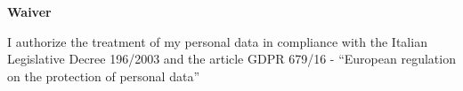 \documentclass[10pt]{article}
\begin{document}









\vfill
{\centering \textbf{Waiver} \par}
{\small I authorize the treatment of my personal data in compliance with the Italian Legislative Decree 196/2003 and the article GDPR 679/16 - “European regulation on the protection of personal data”}
\end{document}

